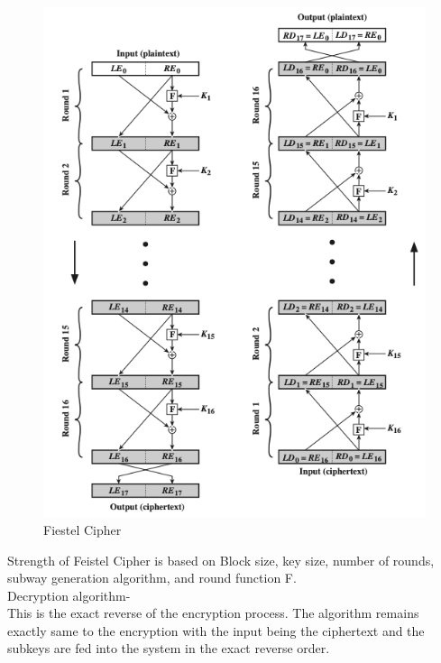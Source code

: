 \documentclass{article}
\begin{document}
\begin{figure}
\begin{center}
    
    \includegraphics[scale = 0.70]{images/fiestel.png}
    \caption{Fiestel Cipher}

\end{center}
 \end{figure}
Strength of Feistel Cipher is based on Block size, key size, number of rounds, subway generation algorithm, and round function F.\\
Decryption algorithm-\\
This is the exact reverse of the encryption process. The algorithm remains exactly same to the encryption with the input being the ciphertext and the subkeys are fed into the system in the exact reverse order.
\end{document}
